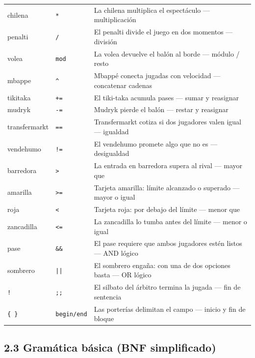 \documentclass[12pt,a4paper]{article}
\begin{document}
\begin{center}
\begin{longtable}{>{\ttfamily}p{4cm} p{3cm} p{6.5cm}}
chilena           & \texttt{*}          & La chilena multiplica el espectáculo — multiplicación \\
penalti           & \texttt{/}          & El penalti divide el juego en dos momentos — división \\
volea             & \texttt{mod}        & La volea devuelve el balón al borde — módulo / resto \\
mbappe            & \texttt{\^{}}       & Mbappé conecta jugadas con velocidad — concatenar cadenas \\
tikitaka          & \texttt{+=}         & El tiki-taka acumula pases — sumar y reasignar \\
mudryk            & \texttt{-=}         & Mudryk pierde el balón — restar y reasignar \\
transfermarkt     & \texttt{==}         & Transfermarkt cotiza si dos jugadores valen igual — igualdad \\
vendehumo         & \texttt{!=}         & El vendehumo promete algo que no es — desigualdad \\
barredora         & \texttt{>}          & La entrada en barredora supera al rival — mayor que \\
amarilla          & \texttt{>=}         & Tarjeta amarilla: límite alcanzado o superado — mayor o igual \\
roja              & \texttt{<}          & Tarjeta roja: por debajo del límite — menor que \\
zancadilla        & \texttt{<=}         & La zancadilla lo tumba antes del límite — menor o igual \\
pase              & \texttt{\&\&}       & El pase requiere que ambos jugadores estén listos — AND lógico \\
sombrero          & \texttt{||}         & El sombrero engaña: con una de dos opciones basta — OR lógico \\
\texttt{!}        & \texttt{;;}         & El silbato del árbitro termina la jugada — fin de sentencia \\
\texttt{\{ \}}    & \texttt{begin/end}  & Las porterías delimitan el campo — inicio y fin de bloque \\

\end{longtable}
\end{center}

\subsection*{2.3 Gramática básica (BNF simplificado)}
\end{document}
